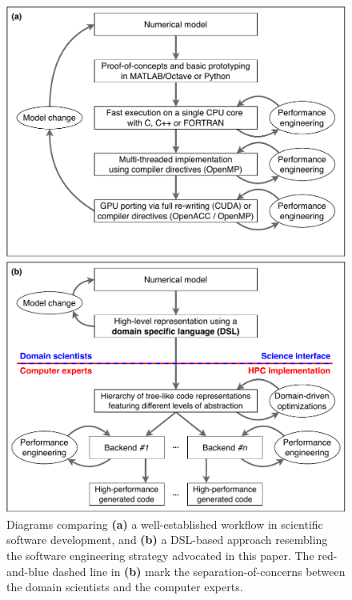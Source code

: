 \documentclass[gmd,manuscript,online]{copernicus}
\theoremstyle{theorem}
\theoremstyle{definition}
\theoremstyle{remark}
\theoremstyle{proposition}
\begin{document}
	\begin{figure}[t!]
		\centering

		\begin{minipage}{0.495\textwidth}
			\centering
			\includegraphics[scale=0.475]{workflow_2.pdf}
		\end{minipage}
		\begin{minipage}{0.495\textwidth}
			\centering
			\includegraphics[scale=0.475]{workflow_dsl_2.pdf}
		\end{minipage}

		\caption{Diagrams comparing \textbf{(a)} a well-established workflow in scientific software development, and \textbf{(b)} a DSL-based approach resembling the software engineering strategy advocated in this paper. The red-and-blue dashed line in \textbf{(b)} mark the separation-of-concerns between the domain scientists and the computer experts.}
		\label{fig:dsl}
	\end{figure}
\end{document}
